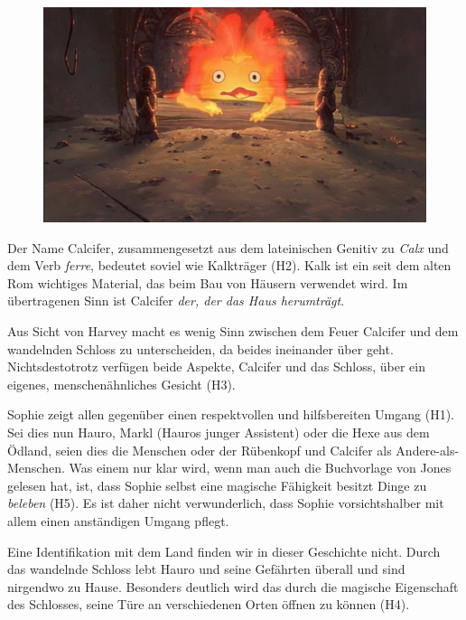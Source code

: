 \begin{figure}
\centering
  \centering
  \includegraphics[width=.8\linewidth]{images/00-21-29_calcifer.png}
  \label{fig:test1}
\end{figure}


Der Name Calcifer, zusammengesetzt aus dem lateinischen Genitiv zu \emph{Calx} und dem Verb \emph{ferre}, bedeutet soviel wie Kalkträger (H2). Kalk ist ein seit dem alten Rom wichtiges Material, das beim Bau von Häusern verwendet wird. Im übertragenen Sinn ist Calcifer \emph{der, der das Haus herumträgt}.

Aus Sicht von Harvey macht es wenig Sinn zwischen dem Feuer Calcifer und dem wandelnden Schloss zu unterscheiden, da beides ineinander über geht. Nichtsdestotrotz verfügen beide Aspekte, Calcifer und das Schloss, über ein eigenes, menschenähnliches Gesicht (H3).

Sophie zeigt allen gegenüber einen respektvollen und hilfsbereiten Umgang (H1). Sei dies nun Hauro, Markl (Hauros junger Assistent) oder die Hexe aus dem Ödland, seien dies die Menschen oder der Rübenkopf und Calcifer als Andere-als-Menschen. Was einem nur klar wird, wenn man auch die Buchvorlage von Jones gelesen hat, ist, dass Sophie selbst eine magische Fähigkeit besitzt Dinge zu \emph{beleben} (H5). Es ist daher nicht verwunderlich, dass Sophie vorsichtshalber mit allem einen anständigen Umgang pflegt.

Eine Identifikation mit dem Land finden wir in dieser Geschichte nicht. Durch das wandelnde Schloss lebt Hauro und seine Gefährten überall und sind nirgendwo zu Hause. Besonders deutlich wird das durch die magische Eigenschaft des Schlosses, seine Türe an verschiedenen Orten öffnen zu können (H4).

